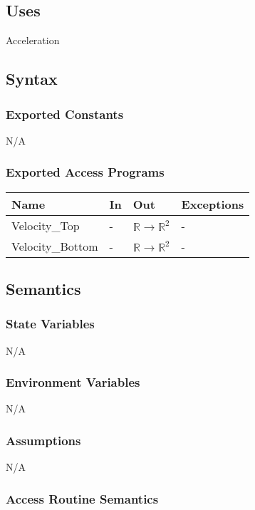 \documentclass[12pt, titlepage]{article}
\begin{document}
\subsection{Uses}
Acceleration

\subsection{Syntax}

\subsubsection{Exported Constants}
N/A

\subsubsection{Exported Access Programs}

\begin{center}
\begin{tabular}{p{4cm} p{2cm} p{2cm} p{4cm}}
\hline
\textbf{Name} & \textbf{In} & \textbf{Out} & \textbf{Exceptions} \\
\hline
Velocity\_Top & - & $\mathbb{R} \rightarrow \mathbb{R}^2$ & - \\
\hline
Velocity\_Bottom & - & $\mathbb{R} \rightarrow \mathbb{R}^2$ & - \\
\hline
\end{tabular}
\end{center}

\subsection{Semantics}

\subsubsection{State Variables}
N/A
\subsubsection{Environment Variables}
N/A
\subsubsection{Assumptions}
N/A
\subsubsection{Access Routine Semantics}
\end{document}
